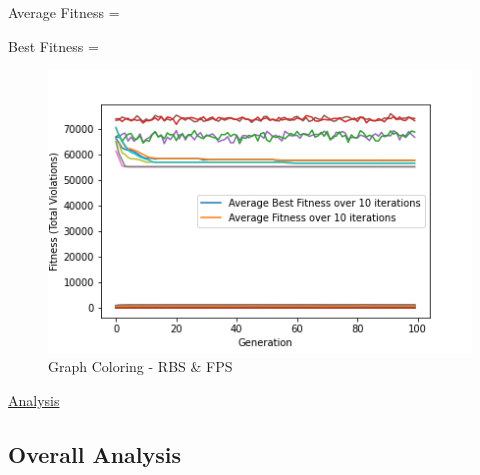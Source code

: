 \documentclass[11pt, letterpaper]{article}
\begin{document}
Average Fitness = 

Best Fitness = 
\begin{figure}[H]
    \centering
    \includegraphics[scale = 0.6]{images/graphcoloring_rb_fp.png}
    \caption {Graph Coloring - RBS \& FPS}
    \label {fig:gcBF}
\end{figure}

\underline{Analysis}
\subsection {Overall Analysis}
\end{document}
